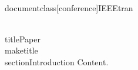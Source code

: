 \\documentclass[conference]{IEEEtran}
\begin{document}
\\title{Paper}
\\maketitle
\\section{Introduction}
Content.
\
\end{document}
